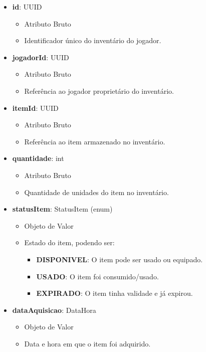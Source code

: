     \begin{itemize}
        \item \textbf{id}: UUID  
              \begin{itemize}
                  \item Atributo Bruto
                  \item Identificador único do inventário do jogador.
              \end{itemize}
    
        \item \textbf{jogadorId}: UUID  
              \begin{itemize}
                  \item Atributo Bruto
                  \item Referência ao jogador proprietário do inventário.
              \end{itemize}
    
        \item \textbf{itemId}: UUID  
              \begin{itemize}
                  \item Atributo Bruto
                  \item Referência ao item armazenado no inventário.
              \end{itemize}
    
        \item \textbf{quantidade}: int  
              \begin{itemize}
                  \item Atributo Bruto
                  \item Quantidade de unidades do item no inventário.
              \end{itemize}
    
        \item \textbf{statusItem}: StatusItem (enum)  
              \begin{itemize}
                  \item Objeto de Valor
                  \item Estado do item, podendo ser:
                  \begin{itemize}
                      \item \textbf{DISPONIVEL}: O item pode ser usado ou equipado.
                      \item \textbf{USADO}: O item foi consumido/usado.
                      \item \textbf{EXPIRADO}: O item tinha validade e já expirou.
                  \end{itemize}
              \end{itemize}
    
        \item \textbf{dataAquisicao}: DataHora  
              \begin{itemize}
                  \item Objeto de Valor
                  \item Data e hora em que o item foi adquirido.
              \end{itemize}
    \end{itemize}
    
